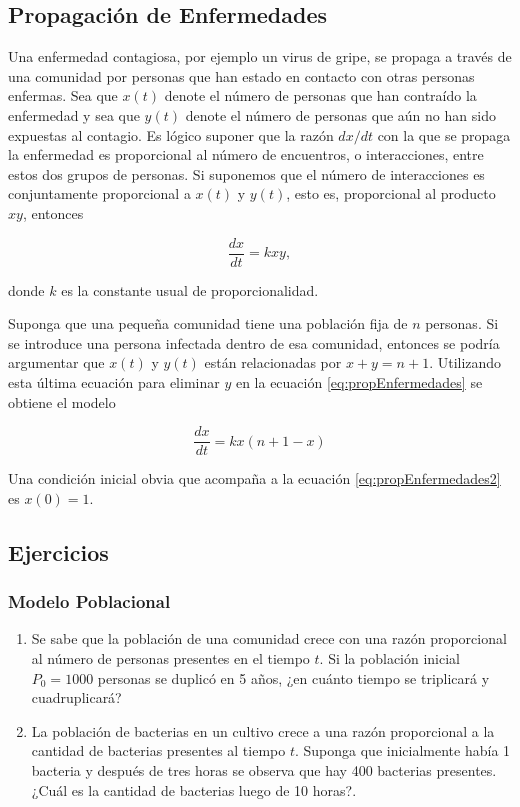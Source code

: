 \subsection{Propagación de Enfermedades}

Una enfermedad contagiosa, por ejemplo un virus de gripe, se propaga a través de una comunidad por personas que han estado en contacto 
con otras personas enfermas. Sea que $x(t)$ denote el número de personas que han contraído la enfermedad y sea que $y(t)$ denote el número 
de personas que aún no han sido expuestas al contagio. Es lógico suponer que la razón $dx/dt$ con la que se propaga la enfermedad es 
proporcional al número de encuentros, o interacciones, entre estos dos grupos de personas. Si suponemos que el número de interacciones 
es conjuntamente proporcional a $x(t)$ y $y(t)$, esto es, proporcional al producto $xy$, entonces

\begin{equation}
	\dfrac{dx}{dt} = kxy,
	\label{eq:propEnfermedades}
\end{equation}

donde $k$ es la constante usual de proporcionalidad. 

Suponga que una pequeña comunidad  tiene una población fija de $n$ personas. Si se introduce una persona infectada dentro de esa comunidad, 
entonces se podría argumentar que $x(t)$ y $y(t)$ están relacionadas por $x+y=n+1$. Utilizando esta última ecuación para eliminar $y$ en 
la ecuación \ref{eq:propEnfermedades} se obtiene el modelo

\begin{equation}
	\dfrac{dx}{dt} = kx(n+1-x)
	\label{eq:propEnfermedades2}
\end{equation}

Una condición inicial obvia que acompaña a la ecuación \ref{eq:propEnfermedades2} es $x(0)=1$.

\subsection*{Ejercicios}

\subsubsection{Modelo Poblacional}

\begin{enumerate}
	\item Se sabe que la población de una comunidad crece con una razón proporcional al número de personas presentes en el tiempo $t$. 
	    Si la población inicial $P_0 = 1000$ personas se duplicó en 5 años, ¿en cuánto tiempo se triplicará y cuadruplicará?
	\item La población de bacterias en un cultivo crece a una razón proporcional a la cantidad de bacterias presentes al tiempo $t$. 
	    Suponga que inicialmente había 1 bacteria y después de tres horas se observa que hay 400 bacterias presentes. ¿Cuál es la 
	    cantidad de bacterias luego de 10 horas?. 
\end{enumerate}


